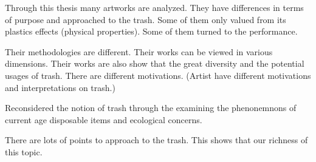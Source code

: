 











%
%
Through this thesis many artworks are analyzed. They have differences in terms of purpose and approached to the trash. Some of them only valued from its plastics effects (physical properties). Some of them turned to the performance. 

Their methodologies are different. Their works can be viewed in various dimensions. Their works are also show that the great diversity and the potential usages of trash. There are different motivations. (Artist have different motivations and interpretations on trash.)

Reconsidered the notion of trash through the examining the phenonemnons of current age disposable items and ecological concerns. 

There are lots of points to approach to the trash. This shows that our richness of this topic. 












